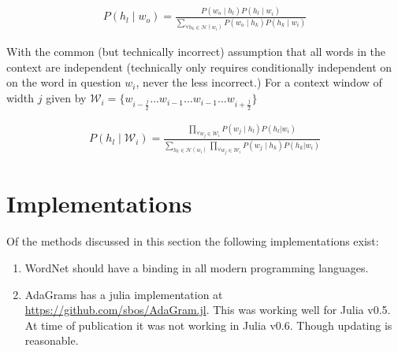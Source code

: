 \documentclass[12pt,parskip]{komatufte}
\begin{document}
\begin{align}
P(h_l \mid w_o) = \frac{P(w_o \mid h_l) P(h_l \mid w_i)}{\sum_{\forall h_k \in \mathcal{H}(w_i)} P(w_o \mid h_k) P(h_k \mid w_i)}
\end{align}

With the common (but technically incorrect) assumption that all words in the context are independent (technically only requires conditionally independent on on the word in question $w_i$, never the less incorrect.)
For a context window of width $j$ given by $\mathcal{W}_i = \lbrace w_{i-\frac{j}{2}} \ldots w_{i-1} \ldots w_{i-1} \dots w_{i+\frac{j}{2}} \rbrace$

\begin{align}
P(h_l \mid \mathcal{W}_i) = 
\frac{\prod_{\forall w_{j}\in \mathcal{W}_i} P(w_{j} \mid h_l) P(h_l | w_i)}{\sum_{h_k \in \mathcal{H}(w_i)} \prod_{\forall w_{j} \in \mathcal{W}_i} P(w_{j} \mid h_k) P(h_k | w_i)}
\end{align}


\section{Implementations}
Of the methods discussed in this section the following implementations exist:
\begin{enumerate}
	\item WordNet \parencite{tengi1998design} should have a binding in all modern programming languages.
	\item AdaGrams \parencite{AdaGrams} has a julia implementation at \url{https://github.com/sbos/AdaGram.jl}. This was working well for Julia v0.5. At time of publication it was not working in Julia v0.6. Though updating is reasonable.
\end{enumerate}
\end{document}
